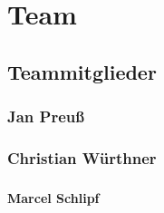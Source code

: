 \chapter{Team}

\section{Teammitglieder}

\subsection*{Jan Preuß}

\subsection*{Christian Würthner}

\subsection*{}

\subsubsection*{Marcel Schlipf}